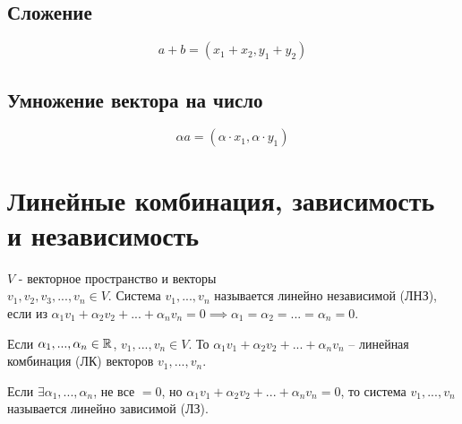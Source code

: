 \documentclass[main]{subfiles}
\begin{document}
\subsection{Сложение}
\begin{equation*}
    a + b = (x_1+x_2, y_1+y_2)
\end{equation*}

\subsection{Умножение вектора на число}
\begin{equation*}
    \alpha a = (\alpha\cdot x_1, \alpha\cdot y_1)
\end{equation*}

\section[ЛК, ЛЗ и ЛНЗ]{Линейные комбинация, зависимость и независимость}
\begin{definition}
    $V$ - векторное пространство и векторы \\ $v_1,v_2,v_3,..., v_n \in V$.
    Система $v_1,...,v_n$ называется линейно независимой (ЛНЗ), если из
    $\alpha_1 v_1 + \alpha_2 v_2 + ... + \alpha_n v_n = 0 \implies \alpha_1=\alpha_2=...=\alpha_n =0$.
\end{definition}

\begin{definition}
    Если $\alpha_1,..., \alpha_n \in \mathbb{R}$, $v_1,...,v_n \in V$.
    То $\alpha_1 v_1 + \alpha_2 v_2 + ... + \alpha_n v_n$ -- линейная комбинация (ЛК)
    векторов $v_1,...,v_n$.
\end{definition}

\begin{definition}
    Если $\exists \alpha_1,..., \alpha_n$, не все $=0$, но $\alpha_1 v_1 + \alpha_2 v_2 + ... + \alpha_n v_n = 0$,
    то система $v_1,...,v_n$ называется линейно зависимой (ЛЗ).
\end{definition}
\end{document}
